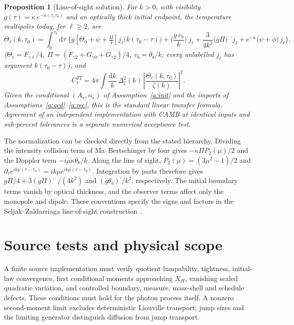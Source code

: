 \documentclass[11pt]{article}
\newtheorem{proposition}[theorem]{Proposition}
\theoremstyle{remark}
\newcommand{\Dd}{\mathrm{d}}
\newcommand{\kdot}{\dot\kappa}
\begin{document}
\begin{proposition}[Line-of-sight solution]\label{p:los}
For $k>0$, with visibility $g(\tau)=\kdot\,e^{-\kappa(\tau,\tau_0)}$ and an
optically thick initial endpoint, the temperature multipoles today, for
$\ell\geq2$, are
\[
\Theta_\ell(k,\tau_0)=\int_0^{\tau_0}\!\Dd\tau\;
\Big\{
g\left[\Theta_0+\psi+\tfrac{\Pi}{4}\right]
j_\ell\big(k(\tau_0-\tau)\big)
+\Big(\frac{g\,v_b}{k}\Big)^{\!\cdot} j_\ell
+\frac{3}{4k^2}\big(g\Pi\big)^{\!\cdot\cdot}j_\ell
+e^{-\kappa}\big(\dot\psi+\dot\phi\big)\,j_\ell
\Big\},
\]
($\Theta_\ell=F_{\gamma\ell}/4$,
$\Pi=(F_{\gamma2}+G_{\gamma0}+G_{\gamma2})/4$,
$v_b=\theta_b/k$; every unlabelled
$j_\ell$ has argument $k(\tau_0-\tau)$), and
\[
C_\ell^{TT}=4\pi\!\int\!\frac{\Dd k}{k}\,
\Delta_\zeta^2(k)\,\left|\frac{\Theta_\ell(k,\tau_0)}{\zeta(k)}\right|^2 .
\]
Given the conditional $(A_s,n_s)$ of Assumption~\ref{a:init} and the imports of
Assumptions~\ref{a:qed}--\ref{a:rec}, this is the standard linear transfer
formula. Agreement of an independent implementation with CAMB at identical
inputs and sub-percent tolerances is a separate numerical acceptance test.
\end{proposition}

The normalization can be checked directly from the stated hierarchy.
Dividing the intensity collision term of Ma--Bertschinger by four gives
$-\kdot\Pi P_2(\mu)/2$ and the Doppler term $-i\mu\kdot\theta_b/k$.
Along the line of sight, $P_2(\mu)=(3\mu^2-1)/2$ and
$\partial_\tau e^{ik\mu(\tau-\tau_0)}=ik\mu e^{ik\mu(\tau-\tau_0)}$.
Integration by parts therefore gives $g\Pi/4+3(g\Pi)^{\cdot\cdot}/(4k^2)$
and $(g\theta_b)^{\cdot}/k^2$, respectively. The initial boundary terms
vanish by optical thickness, and the observer terms affect only the
monopole and dipole. These conventions specify the signs and factors in
the Seljak--Zaldarriaga line-of-sight construction~\cite{seljakzaldarriaga}.

\section{Source tests and physical scope}\label{s:premises}
A finite source implementation must verify quotient lumpability, tightness,
initial-law convergence, first conditional moments approaching \(X_H\),
vanishing scaled quadratic variation, and controlled boundary, measure,
mass-shell and schedule defects. These conditions must hold for the photon process itself. A nonzero
second-moment limit excludes deterministic Liouville transport; jump sizes
and the limiting generator distinguish diffusion from jump transport.
\end{document}
